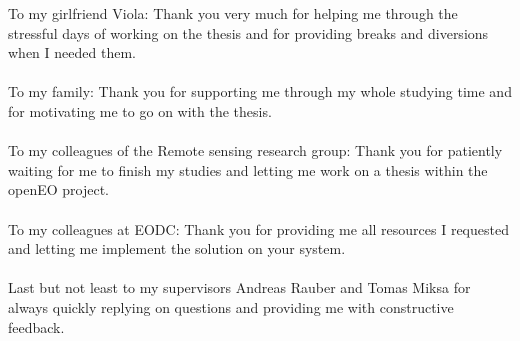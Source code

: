 \documentclass[draft,final]{vutinfth} %
\begin{document}
\frontmatter %

\addstatementpage




\begin{acknowledgements*}
To my girlfriend Viola: Thank you very much for helping me through the stressful days of working on the thesis and for providing breaks and diversions when I needed them.\\ \\
To my family: Thank you for supporting me through my whole studying time and for motivating me to go on with the thesis. \\ \\
To my colleagues of the Remote sensing research group: Thank you for patiently waiting for me to finish my studies and letting me work on a thesis within the openEO project. \\ \\
To my colleagues at EODC: Thank you for providing me all resources I requested and letting me implement the solution on your system. \\ \\
Last but not least to my supervisors Andreas Rauber and Tomas Miksa for always quickly replying on questions and providing me with constructive feedback. 
\end{acknowledgements*}
\end{document}
